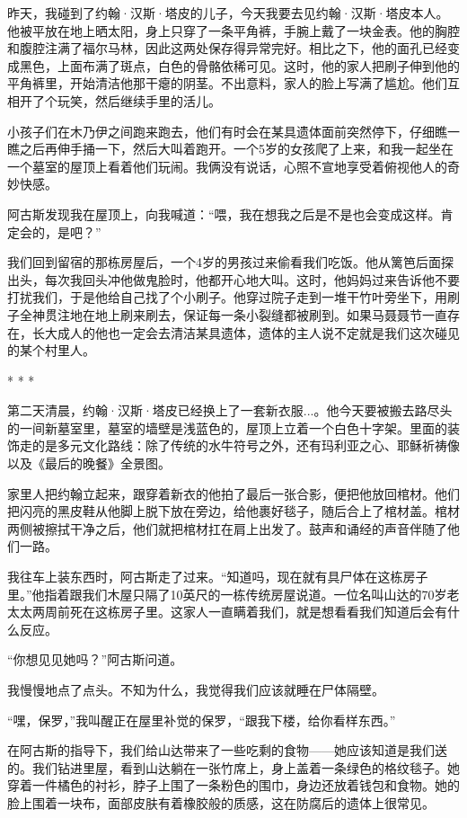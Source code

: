 \documentclass[12pt,oneside]{book}
\begin{document}
\begin{bookref}[frametitle={\cite{好好告别：世界葬礼观察手记}}]
昨天，我碰到了约翰·汉斯·塔皮的儿子，今天我要去见约翰·汉斯·塔皮本人。他被平放在地上晒太阳，身上只穿了一条平角裤，手腕上戴了一块金表。他的胸腔和腹腔注满了福尔马林，因此这两处保存得异常完好。相比之下，他的面孔已经变成黑色，上面布满了斑点，白色的骨骼依稀可见。这时，他的家人把刷子伸到他的平角裤里，开始清洁他那干瘪的阴茎。不出意料，家人的脸上写满了尴尬。他们互相开了个玩笑，然后继续手里的活儿。

小孩子们在木乃伊之间跑来跑去，他们有时会在某具遗体面前突然停下，仔细瞧一瞧之后再伸手捅一下，然后大叫着跑开。一个5岁的女孩爬了上来，和我一起坐在一个墓室的屋顶上看着他们玩闹。我俩没有说话，心照不宣地享受着俯视他人的奇妙快感。

阿古斯发现我在屋顶上，向我喊道：“喂，我在想我之后是不是也会变成这样。肯定会的，是吧？”

我们回到留宿的那栋房屋后，一个4岁的男孩过来偷看我们吃饭。他从篱笆后面探出头，每次我回头冲他做鬼脸时，他都开心地大叫。这时，他妈妈过来告诉他不要打扰我们，于是他给自己找了个小刷子。他穿过院子走到一堆干竹叶旁坐下，用刷子全神贯注地在地上刷来刷去，保证每一条小裂缝都被刷到。如果马聂聂节一直存在，长大成人的他也一定会去清洁某具遗体，遗体的主人说不定就是我们这次碰见的某个村里人。

\begin{center}
* * *
\end{center}

第二天清晨，约翰·汉斯·塔皮已经换上了一套新衣服...。他今天要被搬去路尽头的一间新墓室里，墓室的墙壁是浅蓝色的，屋顶上立着一个白色十字架。里面的装饰走的是多元文化路线：除了传统的水牛符号之外，还有玛利亚之心、耶稣祈祷像以及《最后的晚餐》全景图。

家里人把约翰立起来，跟穿着新衣的他拍了最后一张合影，便把他放回棺材。他们把闪亮的黑皮鞋从他脚上脱下放在旁边，给他裹好毯子，随后合上了棺材盖。棺材两侧被擦拭干净之后，他们就把棺材扛在肩上出发了。鼓声和诵经的声音伴随了他们一路。

我往车上装东西时，阿古斯走了过来。“知道吗，现在就有具尸体在这栋房子里。”他指着跟我们木屋只隔了10英尺的一栋传统房屋说道。一位名叫山达的70岁老太太两周前死在这栋房子里。这家人一直瞒着我们，就是想看看我们知道后会有什么反应。

“你想见见她吗？”阿古斯问道。

我慢慢地点了点头。不知为什么，我觉得我们应该就睡在尸体隔壁。

“嘿，保罗，”我叫醒正在屋里补觉的保罗，“跟我下楼，给你看样东西。”

在阿古斯的指导下，我们给山达带来了一些吃剩的食物——她应该知道是我们送的。我们钻进里屋，看到山达躺在一张竹席上，身上盖着一条绿色的格纹毯子。她穿着一件橘色的衬衫，脖子上围了一条粉色的围巾，身边还放着钱包和食物。她的脸上围着一块布，面部皮肤有着橡胶般的质感，这在防腐后的遗体上很常见。


\end{bookref}
\end{document}

